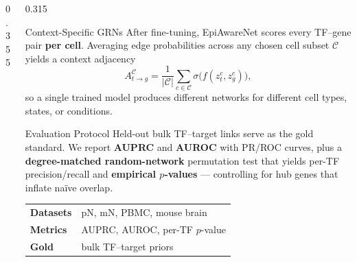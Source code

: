 \documentclass[final,25pt]{beamer}
\newcommand{\keyword}[1]{\textcolor{primary}{\bfseries #1}}
\begin{document}
\begin{frame}[t]
\begin{columns}[t]
\begin{column}{0.355\textwidth}
\end{column}

\begin{column}{0.315\textwidth}

\begin{card}[violet]{Context-Specific GRNs}
  After fine-tuning, EpiAwareNet scores every TF--gene pair
  \keyword{per cell}. Averaging edge probabilities across any chosen
  cell subset $\mathcal{C}$ yields a context adjacency
  \[
  A^{\mathcal{C}}_{t\to g}=\frac{1}{|\mathcal{C}|}\sum_{c\in\mathcal{C}}
      \sigma\!\big(f(z^{c}_{t},z^{c}_{g})\big),
  \]
  so a single trained model produces different networks for different cell
  types, states, or conditions.
\end{card}

\vspace{1.15cm}

\begin{card}[primary]{Evaluation Protocol}
  \small
  Held-out bulk TF--target links serve as the gold standard. We report
  \keyword{AUPRC} and \keyword{AUROC} with PR/ROC curves, plus a
  \keyword{degree-matched random-network} permutation test that yields
  per-TF precision/recall and \keyword{empirical $p$-values} — controlling
  for hub genes that inflate naïve overlap.

  \vspace{10pt}
  \begin{center}
  \renewcommand{\arraystretch}{1.25}
  \begin{tabular}{@{}ll@{}}
    \toprule
    \textbf{Datasets} & pN, mN, PBMC, mouse brain \\
    \textbf{Metrics}  & AUPRC, AUROC, per-TF $p$-value \\
    \textbf{Gold}     & bulk TF--target priors \\
    \bottomrule
  \end{tabular}
  \end{center}
\end{card}

\vspace{1.15cm}


\end{column}
\end{columns}
\end{frame}
\end{document}
